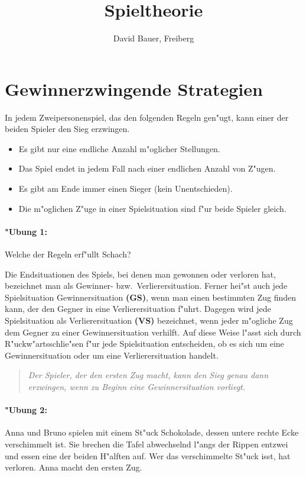 \documentclass[a4paper,11pt]{article}
\author{David Bauer, Freiberg}
\title{Spieltheorie\kosemnetlicensemark}
\date{}
\begin{document}
 
\maketitle 

\section{Gewinnerzwingende Strategien}

In jedem Zweipersonenspiel, das den folgenden Regeln gen"ugt,
kann einer der beiden Spieler den Sieg erzwingen.
\begin{itemize}\setlength{\itemsep}{0pt}
\item Es gibt nur eine endliche Anzahl m"oglicher Stellungen. 
\item Das Spiel endet in jedem Fall nach einer endlichen Anzahl von Z"ugen.
\item Es gibt am Ende immer einen Sieger (kein Unentschieden).
\item Die m"oglichen Z"uge in einer Spielsituation sind f"ur beide Spieler
  gleich.
\end{itemize}
\paragraph*{"Ubung 1:} 
Welche der Regeln erf"ullt Schach?
\medskip

Die Endsituationen des Spiels, bei denen man gewonnen oder verloren hat,
bezeichnet man als Gewinner- bzw.\ Verlierersituation. Ferner hei"st auch jede
Spielsituation Gewinnersituation {\bf (GS)}, wenn man einen bestimmten Zug
finden kann, der den Gegner in eine Verlierersituation f"uhrt. Dagegen wird
jede Spielsituation als Verlierersituation {\bf (VS)} bezeichnet, wenn jeder
m"ogliche Zug dem Gegner zu einer Gewinnersituation verhilft. Auf diese Weise
l"asst sich durch R"uckw"artsschlie"sen f"ur jede Spielsituation entscheiden,
ob es sich um eine Gewinnersituation oder um eine Verlierersituation
handelt. 
\begin{quote}\it Der Spieler, der den ersten Zug macht, kann den Sieg genau
  dann erzwingen, wenn zu Beginn eine Gewinnersituation vorliegt.
\end{quote}

\paragraph*{"Ubung 2:} 
Anna und Bruno spielen mit einem St"uck Schokolade, dessen untere rechte Ecke
verschimmelt ist. Sie brechen die Tafel abwechselnd l"angs der Rippen entzwei
und essen eine der beiden H"alften auf. Wer das verschimmelte St"uck isst, hat
verloren. Anna macht den ersten Zug.
\end{document}

